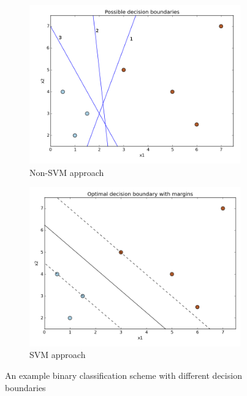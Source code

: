 \documentclass{article}
\begin{document}
	\begin{figure}[h]
		\centering
		\begin{subfigure}[h]{0.45\textwidth}
			\centering
			\includegraphics[scale=0.35]{typical_svm_possible_boundaries}
			\caption{Non-SVM approach}
			\label{fig:possible_decision_boundaries}
		\end{subfigure}
		\begin{subfigure}[h]{0.45\textwidth}
			\centering
			\includegraphics[scale=0.35]{typical_svm_optimal_boundary}
			\caption{SVM approach}
			\label{fig:optimal_decision_boundary}
		\end{subfigure}
		\caption{An example binary classification scheme with different decision boundaries}
		\label{fig:svm_decision_boundary_demo}
	\end{figure}
	
\end{document}
